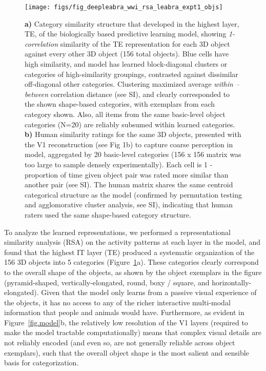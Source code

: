 \documentclass[11pt,twoside]{article}
\newif\myifpdf
\begin{document}
\begin{figure}
  \centering\texttt{[image: figs/fig\_deepleabra\_wwi\_rsa\_leabra\_expt1\_objs]}
  \caption{{\bf a)} Category similarity structure that developed in the highest layer, TE, of the biologically based predictive learning model, showing \emph{1-correlation} similarity of the TE representation for each 3D object against every other 3D object (156 total objects). Blue cells have high similarity, and model has learned block-diagonal clusters or categories of high-similarity groupings, contrasted against dissimilar off-diagonal other categories.  Clustering maximized average \emph{within -- between} correlation distance (see SI), and clearly corresponded to the shown shape-based categories, with exemplars from each category shown.  Also, all items from the same basic-level object categories (N=20) are reliably subsumed within learned categories. {\bf b)} Human similarity ratings for the same 3D objects, presented with the V1 reconstruction (see Fig 1b) to capture coarse perception in model, aggregated by 20 basic-level categories (156 x 156 matrix was too large to sample densely experimentally).  Each cell is 1 - proportion of time given object pair was rated more similar than another pair (see SI).  The human matrix shares the same centroid categorical structure as the model (confirmed by permutation testing and agglomorative cluster analysis, see SI), indicating that human raters used the same shape-based category structure.}
  \label{fig.rsa}
\end{figure}

To analyze the learned representations, we performed a representational similarity analysis (RSA) on the activity patterns at each layer in the model, and found that the highest IT layer (TE) produced a systematic organization of the 156 3D objects into 5 categories (Figure~\ref{fig.rsa}a).  These categories clearly correspond to the overall shape of the objects, as shown by the object exemplars in the figure (pyramid-shaped, vertically-elongated, round, boxy / square, and horizontally-elongated).  Given that the model only learns from a passive visual experience of the objects, it has no access to any of the richer interactive multi-modal information that people and animals would have.  Furthermore, as evident in Figure~\ref{fig.model}b, the relatively low resolution of the V1 layers (required to make the model tractable computationally) means that complex visual details are not reliably encoded (and even so, are not generally reliable across object exemplars), such that the overall object shape is the most salient and sensible basis for categorization.
\end{document}
